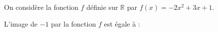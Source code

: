 
On considère la fonction $f$ définie sur $\mathbb{R}$ par $f(x)=-2x^2+3x+1$.

L'image de $-1$ par la fonction $f$ est égale à :

\smallskip

